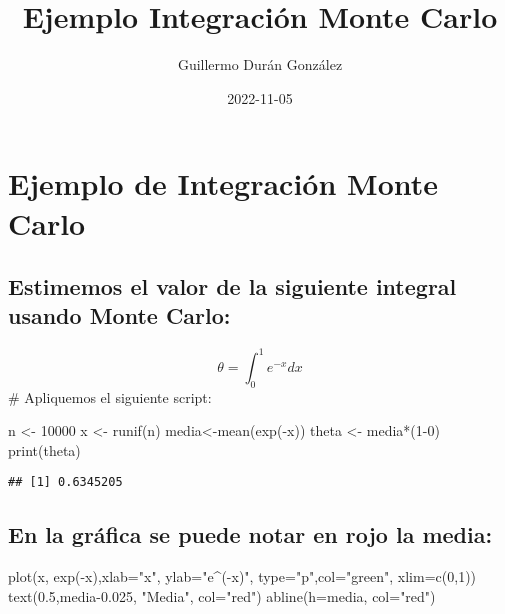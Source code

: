 \documentclass[
]{article}
\title{Ejemplo Integración Monte Carlo}
\author{Guillermo Durán González}
\date{2022-11-05}
\newenvironment{Shaded}{\begin{snugshade}}{\end{snugshade}}
\newcommand{\AttributeTok}[1]{\textcolor[rgb]{0.77,0.63,0.00}{#1}}
\newcommand{\DecValTok}[1]{\textcolor[rgb]{0.00,0.00,0.81}{#1}}
\newcommand{\FloatTok}[1]{\textcolor[rgb]{0.00,0.00,0.81}{#1}}
\newcommand{\FunctionTok}[1]{\textcolor[rgb]{0.00,0.00,0.00}{#1}}
\newcommand{\NormalTok}[1]{#1}
\newcommand{\OtherTok}[1]{\textcolor[rgb]{0.56,0.35,0.01}{#1}}
\newcommand{\SpecialCharTok}[1]{\textcolor[rgb]{0.00,0.00,0.00}{#1}}
\newcommand{\StringTok}[1]{\textcolor[rgb]{0.31,0.60,0.02}{#1}}
\begin{document}
\maketitle

\hypertarget{ejemplo-de-integraciuxf3n-monte-carlo}{%
\section{Ejemplo de Integración Monte
Carlo}\label{ejemplo-de-integraciuxf3n-monte-carlo}}

\hypertarget{estimemos-el-valor-de-la-siguiente-integral-usando-monte-carlo}{%
\subsection{Estimemos el valor de la siguiente integral usando Monte
Carlo:}\label{estimemos-el-valor-de-la-siguiente-integral-usando-monte-carlo}}

\[
\theta=\int_0^1 e^{-x} d x
\] \# Apliquemos el siguiente script:

\begin{Shaded}
\begin{Highlighting}[]
\NormalTok{n }\OtherTok{\textless{}{-}} \DecValTok{10000}
\NormalTok{x }\OtherTok{\textless{}{-}} \FunctionTok{runif}\NormalTok{(n)}
\NormalTok{media}\OtherTok{\textless{}{-}}\FunctionTok{mean}\NormalTok{(}\FunctionTok{exp}\NormalTok{(}\SpecialCharTok{{-}}\NormalTok{x))}
\NormalTok{theta }\OtherTok{\textless{}{-}}\NormalTok{ media}\SpecialCharTok{*}\NormalTok{(}\DecValTok{1{-}0}\NormalTok{)}
\FunctionTok{print}\NormalTok{(theta)}
\end{Highlighting}
\end{Shaded}

\begin{verbatim}
## [1] 0.6345205
\end{verbatim}

\hypertarget{en-la-gruxe1fica-se-puede-notar-en-rojo-la-media}{%
\subsection{En la gráfica se puede notar en rojo la
media:}\label{en-la-gruxe1fica-se-puede-notar-en-rojo-la-media}}

\begin{Shaded}
\begin{Highlighting}[]
\FunctionTok{plot}\NormalTok{(x, }\FunctionTok{exp}\NormalTok{(}\SpecialCharTok{{-}}\NormalTok{x),}\AttributeTok{xlab=}\StringTok{"x"}\NormalTok{, }\AttributeTok{ylab=}\StringTok{"e\^{}({-}x)"}\NormalTok{, }\AttributeTok{type=}\StringTok{"p"}\NormalTok{,}\AttributeTok{col=}\StringTok{"green"}\NormalTok{, }\AttributeTok{xlim=}\FunctionTok{c}\NormalTok{(}\DecValTok{0}\NormalTok{,}\DecValTok{1}\NormalTok{))}
\FunctionTok{text}\NormalTok{(}\FloatTok{0.5}\NormalTok{,media}\FloatTok{{-}0.025}\NormalTok{, }\StringTok{"Media"}\NormalTok{, }\AttributeTok{col=}\StringTok{"red"}\NormalTok{) }
\FunctionTok{abline}\NormalTok{(}\AttributeTok{h=}\NormalTok{media, }\AttributeTok{col=}\StringTok{"red"}\NormalTok{)}
\end{Highlighting}
\end{Shaded}
\end{document}
